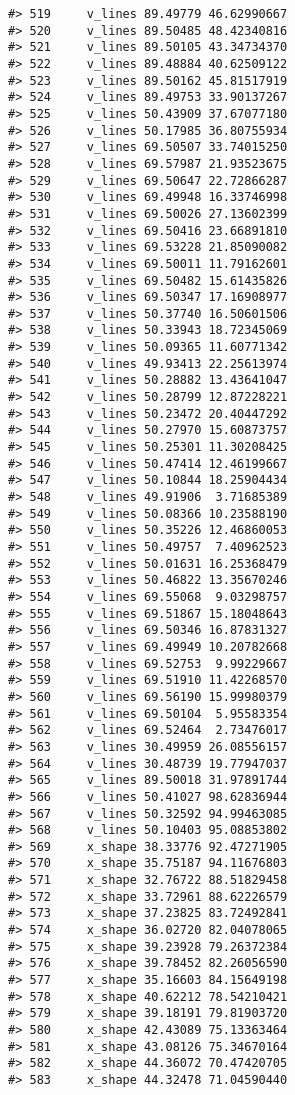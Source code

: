 \documentclass[
]{book}
\theoremstyle{definition}
\theoremstyle{definition}
\theoremstyle{definition}
\theoremstyle{definition}
\theoremstyle{remark}
\begin{document}
\begin{verbatim}
#> 519     v_lines 89.49779 46.62990667
#> 520     v_lines 89.50485 48.42340816
#> 521     v_lines 89.50105 43.34734370
#> 522     v_lines 89.48884 40.62509122
#> 523     v_lines 89.50162 45.81517919
#> 524     v_lines 89.49753 33.90137267
#> 525     v_lines 50.43909 37.67077180
#> 526     v_lines 50.17985 36.80755934
#> 527     v_lines 69.50507 33.74015250
#> 528     v_lines 69.57987 21.93523675
#> 529     v_lines 69.50647 22.72866287
#> 530     v_lines 69.49948 16.33746998
#> 531     v_lines 69.50026 27.13602399
#> 532     v_lines 69.50416 23.66891810
#> 533     v_lines 69.53228 21.85090082
#> 534     v_lines 69.50011 11.79162601
#> 535     v_lines 69.50482 15.61435826
#> 536     v_lines 69.50347 17.16908977
#> 537     v_lines 50.37740 16.50601506
#> 538     v_lines 50.33943 18.72345069
#> 539     v_lines 50.09365 11.60771342
#> 540     v_lines 49.93413 22.25613974
#> 541     v_lines 50.28882 13.43641047
#> 542     v_lines 50.28799 12.87228221
#> 543     v_lines 50.23472 20.40447292
#> 544     v_lines 50.27970 15.60873757
#> 545     v_lines 50.25301 11.30208425
#> 546     v_lines 50.47414 12.46199667
#> 547     v_lines 50.10844 18.25904434
#> 548     v_lines 49.91906  3.71685389
#> 549     v_lines 50.08366 10.23588190
#> 550     v_lines 50.35226 12.46860053
#> 551     v_lines 50.49757  7.40962523
#> 552     v_lines 50.01631 16.25368479
#> 553     v_lines 50.46822 13.35670246
#> 554     v_lines 69.55068  9.03298757
#> 555     v_lines 69.51867 15.18048643
#> 556     v_lines 69.50346 16.87831327
#> 557     v_lines 69.49949 10.20782668
#> 558     v_lines 69.52753  9.99229667
#> 559     v_lines 69.51910 11.42268570
#> 560     v_lines 69.56190 15.99980379
#> 561     v_lines 69.50104  5.95583354
#> 562     v_lines 69.52464  2.73476017
#> 563     v_lines 30.49959 26.08556157
#> 564     v_lines 30.48739 19.77947037
#> 565     v_lines 89.50018 31.97891744
#> 566     v_lines 50.41027 98.62836944
#> 567     v_lines 50.32592 94.99463085
#> 568     v_lines 50.10403 95.08853802
#> 569     x_shape 38.33776 92.47271905
#> 570     x_shape 35.75187 94.11676803
#> 571     x_shape 32.76722 88.51829458
#> 572     x_shape 33.72961 88.62226579
#> 573     x_shape 37.23825 83.72492841
#> 574     x_shape 36.02720 82.04078065
#> 575     x_shape 39.23928 79.26372384
#> 576     x_shape 39.78452 82.26056590
#> 577     x_shape 35.16603 84.15649198
#> 578     x_shape 40.62212 78.54210421
#> 579     x_shape 39.18191 79.81903720
#> 580     x_shape 42.43089 75.13363464
#> 581     x_shape 43.08126 75.34670164
#> 582     x_shape 44.36072 70.47420705
#> 583     x_shape 44.32478 71.04590440

\end{verbatim}
\end{document}
